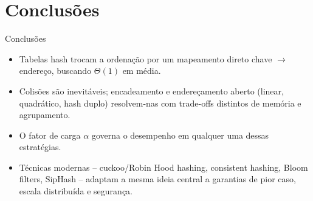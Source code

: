 \documentclass{beamer}
\begin{document}
\section{Conclusões}
\begin{frame}{Conclusões}
  \begin{itemize}
    \item Tabelas hash trocam a ordenação por um mapeamento direto chave $\to$ endereço, buscando $\Theta(1)$ em média.
    \item Colisões são inevitáveis; encadeamento e endereçamento aberto (linear, quadrático, hash duplo) resolvem-nas com trade-offs distintos de memória e agrupamento.
    \item O fator de carga $\alpha$ governa o desempenho em qualquer uma dessas estratégias.
    \item Técnicas modernas -- cuckoo/Robin Hood hashing, consistent hashing, Bloom filters, SipHash -- adaptam a mesma ideia central a garantias de pior caso, escala distribuída e segurança.
  \end{itemize}
\end{frame}


% 
\end{document}
